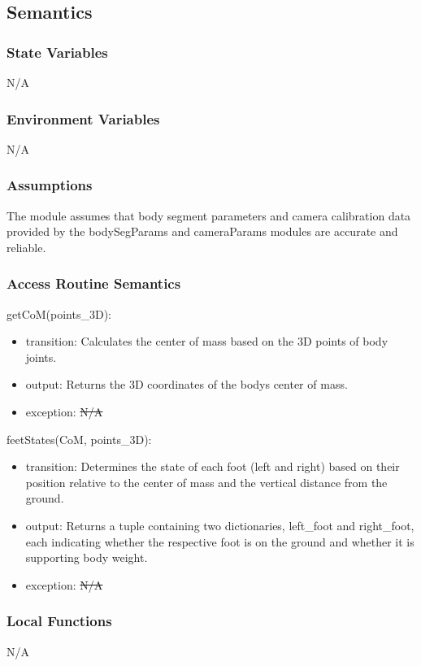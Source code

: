 \documentclass[12pt, titlepage]{article}
\newcommand{\rt}[1]{\textcolor{red}{#1}}
\begin{document}
\subsection{Semantics}

\subsubsection{State Variables}
N/A

\subsubsection{Environment Variables}
N/A

\subsubsection{Assumptions}
The module assumes that body segment parameters and camera calibration data
provided by the bodySegParams and cameraParams modules are accurate and
reliable.

\subsubsection{Access Routine Semantics}

\noindent getCoM(points\_3D):
\begin{itemize}
\item transition: Calculates the center of mass based on the 3D points of body
  joints.
\item output: Returns the 3D coordinates of the bodys center of mass.
\item exception: \sout{N/A} \rt{}
\end{itemize}

\noindent feetStates(CoM, points\_3D):
\begin{itemize}
\item transition: Determines the state of each foot (left and right) based on their
  position relative to the center of mass and the vertical distance from the
  ground.
\item output: Returns a tuple containing two dictionaries, left\_foot and
  right\_foot, each indicating whether the respective foot is on the ground and
  whether it is supporting body weight.
\item exception: \sout{N/A} \rt{}
\end{itemize}

\subsubsection{Local Functions}
N/A
\end{document}
